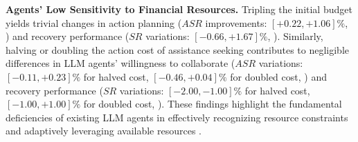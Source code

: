 \textbf{Agents' Low Sensitivity to Financial Resources.}
Tripling the initial budget yields trivial changes in action planning ($ASR$ improvements: $[+0.22,+1.06]\%$, ) and recovery performance ($SR$ variations: $[-0.66,+1.67]\%$, ). Similarly, halving or doubling the action cost of assistance seeking contributes to negligible differences in LLM agents' willingness to collaborate ($ASR$ variations: $[-0.11,+0.23]\%$ for halved cost,  $[-0.46,+0.04]\%$ for doubled cost, ) and recovery performance ($SR$ variations: $[-2.00,-1.00]\%$ for halved cost, $[-1.00,+1.00]\%$ for doubled cost, ).
These findings highlight the fundamental deficiencies of existing LLM agents in effectively recognizing resource constraints and adaptively leveraging available resources \cite{agent_alignment}.







